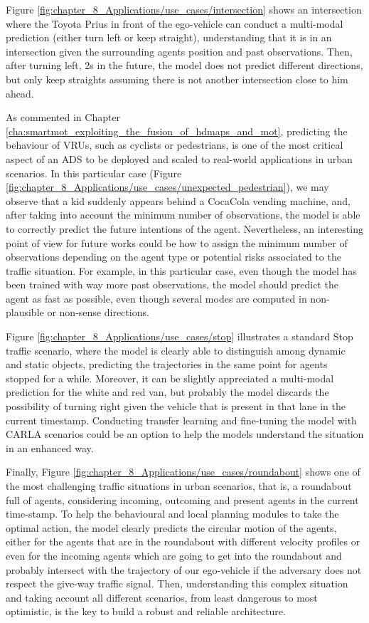 Figure \ref{fig:chapter_8_Applications/use_cases/intersection} shows an intersection where the Toyota Prius in front of the ego-vehicle can conduct a multi-modal prediction (either turn left or keep straight), understanding that it is in an intersection given the surrounding agents position and past observations. Then, after turning left, 2s in the future, the model does not predict different directions, but only keep straights assuming there is not another intersection close to him ahead.

As commented in Chapter \ref{cha:smartmot_exploiting_the_fusion_of_hdmaps_and_mot}, predicting the behaviour of \acp{VRU}, such as cyclists or pedestrians, is one of the most critical aspect of an \ac{ADS} to be deployed and scaled to real-world applications in urban scenarios. In this particular case (Figure \ref{fig:chapter_8_Applications/use_cases/unexpected_pedestrian}), we may observe that a kid suddenly appears behind a CocaCola vending machine, and, after taking into account the minimum number of observations, the model is able to correctly predict the future intentions of the agent. Nevertheless, an interesting point of view for future works could be how to assign the minimum number of observations depending on the agent type or potential risks associated to the traffic situation. For example, in this particular case, even though the model has been trained with way more past observations, the model should predict the agent as fast as possible, even though several modes are computed in non-plausible or non-sense directions.

Figure \ref{fig:chapter_8_Applications/use_cases/stop} illustrates a standard Stop traffic scenario, where the model is clearly able to distinguish among dynamic and static objects, predicting the trajectories in the same point for agents stopped for a while. Moreover, it can be slightly appreciated a multi-modal prediction for the white and red van, but probably the model discards the possibility of turning right given the vehicle that is present in that lane in the current timestamp. Conducting transfer learning and fine-tuning the model with \ac{CARLA} scenarios could be an option to help the models understand the situation in an enhanced way.  

Finally, Figure \ref{fig:chapter_8_Applications/use_cases/roundabout} shows one of the most challenging traffic situations in urban scenarios, that is, a roundabout full of agents, considering incoming, outcoming and present agents in the current time-stamp. To help the behavioural and local planning modules to take the optimal action, the model clearly predicts the circular motion of the agents, either for the agents that are in the roundabout with different velocity profiles or even for the incoming agents which are going to get into the roundabout and probably intersect with the trajectory of our ego-vehicle if the adversary does not respect the give-way traffic signal. Then, understanding this complex situation and taking account all different scenarios, from least dangerous to most optimistic, is the key to build a robust and reliable architecture.

